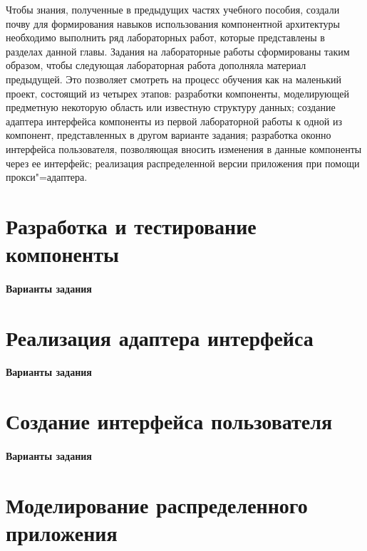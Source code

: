 \documentclass[a4paper,openany,twoside,final]{book}
\begin{document}
Чтобы знания, полученные в предыдущих частях учебного пособия, создали почву для формирования навыков использования компонентной архитектуры необходимо выполнить ряд лабораторных работ, которые представлены в разделах данной главы.  Задания на лабораторные работы сформированы таким образом, чтобы следующая лабораторная работа дополняла материал предыдущей.  Это позволяет смотреть на процесс обучения как на маленький проект, состоящий из четырех этапов: разработки компоненты, моделирующей предметную некоторую область или известную структуру данных; создание адаптера интерфейса компоненты из первой лабораторной работы к одной из компонент, представленных в другом варианте задания; разработка оконно интерфейса пользователя, позволяющая вносить изменения в данные компоненты через ее интерфейс; реализация распределенной версии приложения при помощи прокси"=адаптера.

\section{Разработка и тестирование компоненты}
\label{sec:labcomp}
\newpage

\paragraph{Варианты задания}
\newpage

\section{Реализация адаптера интерфейса}
\label{sec:labadapter}
\newpage

\paragraph{Варианты задания}
\newpage

\section{Создание интерфейса пользователя}
\label{sec:labinterface}

\newpage
\paragraph{Варианты задания}
\newpage

\section{Моделирование распределенного приложения}
\label{sec:labmodel}
\newpage
\end{document}
